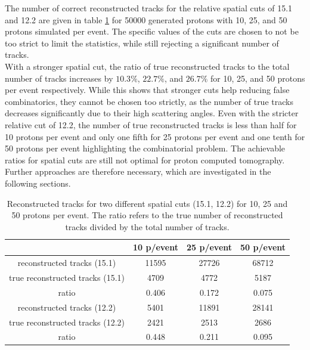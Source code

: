 The number of correct reconstructed tracks for the relative spatial cuts of 15.1 and 12.2 are given in table
\ref{tab:true_tracks} for 50000 generated protons with 10,
25, and 50 protons simulated per event. The specific values of the cuts are chosen to not be too strict to limit the statistics, while still rejecting a significant number
of tracks.\\
With a stronger spatial cut,  the ratio of true reconstructed tracks to
the total number of tracks increases by $10.3\%$, $22.7\%$, and $26.7\%$ for 10, 25, and 50 protons per event respectively.
While this shows that stronger cuts help reducing false combinatorics, they cannot be chosen too strictly,
as the number of true tracks decreases significantly due to their high scattering angles. Even with the stricter relative cut of 12.2, the
number of true reconstructed tracks is less than half for 10 protons per event and only one fifth for 25 protons per event and one tenth for 50 protons per event highlighting
the combinatorial problem. The achievable ratios for spatial cuts are still not optimal for proton computed tomography.
Further approaches are therefore necessary, which are investigated in the following sections.

\begin{table}
  \centering
  \begin{tabular}{c | c c c}
    \toprule
     & 10 p/event & 25 p/event & 50 p/event \\
    \midrule
    reconstructed tracks (15.1) & 11595 & 27726 & 68712  \\
    true reconstructed tracks (15.1) & 4709 & 4772  & 5187 \\
    ratio & 0.406 & 0.172 & 0.075 \\
    \midrule
    reconstructed tracks (12.2) & 5401 & 11891 & 28141 \\
    true reconstructed tracks (12.2) &  2421 &2513  & 2686 \\
    ratio & 0.448 & 0.211 & 0.095
  \end{tabular}
  \caption{Reconstructed tracks for two different spatial cuts (15.1, 12.2) for 10, 25 and 50 protons per event. The ratio refers to the true
  number of reconstructed tracks divided by the total number of tracks.}
  \label{tab:true_tracks}
\end{table}


